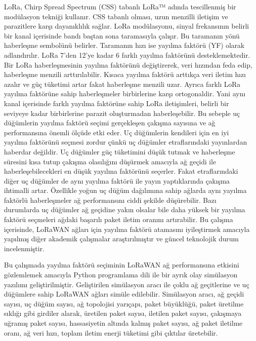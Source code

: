 LoRa, Chirp Spread Spectrum (CSS) tabanlı LoRa™ adında tescillenmiş bir modülasyon tekniği kullanır. CSS tabanlı olması, uzun menzilli iletişim ve parazitlere karşı dayanıklılık sağlar. LoRa modülasyonu, sinyal frekansının belirli bir kanal içerisinde bandı baştan sona taramasıyla çalışır. Bu taramanın yönü haberleşme sembolünü belirler. Taramanın hızı ise yayılma faktörü (YF) olarak adlandırılır. LoRa 7'den 12'ye kadar 6 farklı yayılma faktörünü desteklemektedir. Bir LoRa haberleşmesinin yayılma faktörünü değiştirerek, veri hızından feda edip, haberleşme menzili arttırılabilir. Kısaca yayılma faktörü arttıkça veri iletim hızı azalır ve güç tüketimi artar fakat haberleşme menzili uzar. Ayrıca farklı LoRa yayılma faktörüne sahip haberleşmeler birbirlerine karşı ortogonaldir. Yani aynı kanal içerisinde farklı yayılma faktörüne sahip LoRa iletişimleri, belirli bir seviyeye kadar birbirlerine parazit oluşturmadan haberleşebilir. Bu sebeple uç düğümlerin yayılma faktörü seçimi gerçekleşen çakışma sayısına ve ağ performansına önemli ölçüde etki eder. Uç düğümlerin kendileri için en iyi yayılma faktörünü seçmesi zordur çünkü uç düğümler etraflarındaki yayınlardan haberdar değildir. Uç düğümler güç tüketimini düşük tutmak ve haberleşme süresini kısa tutup çakışma olasılığını düşürmek amacıyla ağ geçidi ile haberleşebilecekleri en düşük yayılma faktörünü seçerler. Fakat etraflarındaki diğer uç düğümler de aynı yayılma faktörü ile yayın yaptıklarında çakışma ihtimalli artar. Özellikle yoğun uç düğüm dağılımına sahip ağlarda aynı yayılma faktörlü haberleşmeler ağ performansını ciddi şekilde düşürebilir. Bazı durumlarda uç düğümler ağ geçidine yakın olsalar bile daha yüksek bir yayılma faktörü seçmeleri ağdaki başarılı paket iletim oranını artırabilir. Bu çalışma içerisinde, LoRaWAN ağları için yayılma faktörü atamasını iyileştirmek amacıyla yapılmış diğer akademik çalışmalar araştırılmıştır ve güncel teknolojik durum incelenmiştir.

Bu çalışmada yayılma faktörü seçiminin LoRaWAN ağ performansına etkisini gözlemlemek amacıyla Python programlama dili ile bir ayrık olay simülasyon yazılımı geliştirilmiştir. Geliştirilen simülasyon aracı ile çoklu ağ geçitlerine ve uç düğümlere sahip LoRaWAN ağları simüle edilebilir. Simülasyon aracı, ağ geçidi sayısı, uç düğüm sayısı, ağ topolojisi yarıçapı, paket büyüklüğü, paket üretilme sıklığı gibi girdiler alarak, üretilen paket sayısı, iletilen paket sayısı, çakışmaya uğramış paket sayısı, hassasiyetin altında kalmış paket sayısı, ağ paket iletilme oranı, ağ veri hızı, toplam iletim enerji tüketimi gibi çıktılar üretebilir. 

